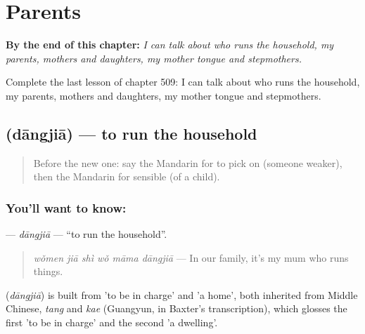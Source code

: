 
\chapter{Parents}
\label{ch:zh-parents}

\begin{chapteropening}
\textbf{By the end of this chapter:} \emph{I can talk about who runs the household, my parents, mothers and daughters, my mother tongue and stepmothers.}

Complete the last lesson of chapter 509: I can talk about who runs the household, my parents, mothers and daughters, my mother tongue and stepmothers.
\end{chapteropening}

\section[\texorpdfstring{\zh{当家} (dāngjiā)}{当家 (dāngjiā)}]{ (dāngjiā) — to run the household}

\label{lesson:ZH-C509-dangjia}



\begin{quote}
Before the new one: say the Mandarin for to pick on (someone weaker), then the Mandarin for sensible (of a child).
\end{quote}

\subsection*{You'll want to know: }
\textbf{} — \emph{dāngjiā} — \textquotedblleft{}to run the household\textquotedblright{}.

\begin{quote}
\textbf{} \emph{wǒmen jiā shì wǒ māma dāngjiā} — In our family, it's my mum who runs things.
\end{quote}

\begin{cousinweb}
\textbf{} (\emph{dāngjiā}) is built from  'to be in charge' and  'a home', both inherited from Middle Chinese, \emph{tang} and \emph{kae} (Guangyun, in Baxter's transcription), which glosses the first 'to be in charge' and the second 'a dwelling'.
\end{cousinweb}

